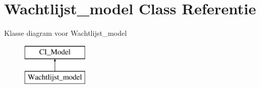 \hypertarget{class_wachtlijst__model}{}\section{Wachtlijst\+\_\+model Class Referentie}
\label{class_wachtlijst__model}
Klasse diagram voor Wachtlijst\+\_\+model\begin{figure}[H]
\begin{center}
\leavevmode
\includegraphics[height=2.000000cm]{class_wachtlijst__model}
\end{center}
\end{figure}
